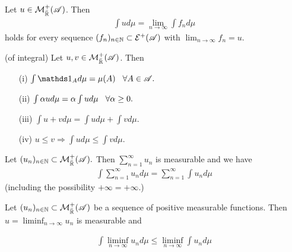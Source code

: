 \begin{corollary}
    Let $u\in \mathcal{M}_{\bar{\mathbb{R}}}^+(\mathscr{A})$. Then \begin{align*}
        \int ud\mu = \lim_{n\rightarrow \infty} \int f_n d\mu
    \end{align*}
    holds for every sequence $(f_n)_{n\in\mathbb{N}}\subset \mathcal{E}^+(\mathscr{A})$ with $\lim_{n\rightarrow\infty} f_n=u.$

\end{corollary}


\begin{proposition} (of integral)
    Let $u,v\in\mathcal{M}_{\bar{\mathbb{R}}}^+(\mathscr{A})$. Then
    \begin{enumerate}
        \item[(i)] $\int \one_A d\mu = \mu(A)\hspace{3mm}\forall A\in\A.$
        \item[(ii)] $\int \alpha ud\mu = \alpha\int u d\mu \hspace{3mm} \forall \alpha\geq 0.$
        \item[(iii)] $\int u+v d\mu = \int u d\mu +\int v d\mu.$
        \item[(iv)]  $u\leq v\Rightarrow \int u d\mu\leq \int v d\mu.$
    \end{enumerate}
\end{proposition}

\begin{corollary}
    Let $(u_n)_{n\in\mathbb{N}}\subset \mathcal{M}_{\bar{\mathbb{R}}}^+(\mathscr{A}).$ Then $\sum_{n=1}^\infty u_n$ is measurable and we have
    \begin{align*}
        \int \sum_{n=1}^\infty u_n d\mu = \sum_{n=1}^\infty \int u_nd\mu
    \end{align*}
    (including the possibility $+\infty = +\infty.$)
\end{corollary}

\begin{theorem}
    Let $(u_n)_{n\in\mathbb{N}}\subset \mathcal{M}_{\bar{\mathbb{R}}}^+(\mathscr{A})$ be a sequence of positive measurable functions. Then 
$u=\liminf_{n\rightarrow\infty} u_n$ is measurable and 

\begin{align}
    \int\liminf_{n\rightarrow\infty}u_n d\mu \leq\liminf_{n\rightarrow\infty}\int u_n d\mu 
\end{align}
\end{theorem} 